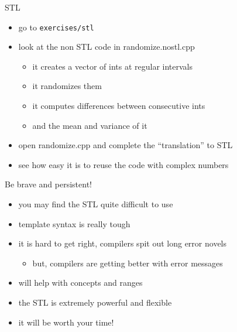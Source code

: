 \begin{frame}[fragile]
  \begin{exercise}{STL}
    \begin{itemize}
    \item go to \texttt{exercises/stl}
    \item look at the non STL code in randomize.nostl.cpp
      \begin{itemize}
        \item it creates a vector of ints at regular intervals
        \item it randomizes them
        \item it computes differences between consecutive ints
        \item and the mean and variance of it
      \end{itemize}
    \item open randomize.cpp and complete the ``translation'' to STL
    \item see how easy it is to reuse the code with complex numbers
    \end{itemize}
  \end{exercise}
\end{frame}

\begin{frame}[fragile]
  \begin{exampleblock}{Be brave and persistent!}
    \begin{itemize}
    \item you may find the STL quite difficult to use
    \item template syntax is really tough
    \item it is hard to get right, compilers spit out long error novels
    \begin{itemize}
      \item but, compilers are getting better with error messages
    \end{itemize}
    \item {} will help with concepts and ranges
    \item the STL is extremely powerful and flexible
    \item it will be worth your time!
    \end{itemize}
  \end{exampleblock}
\end{frame}
